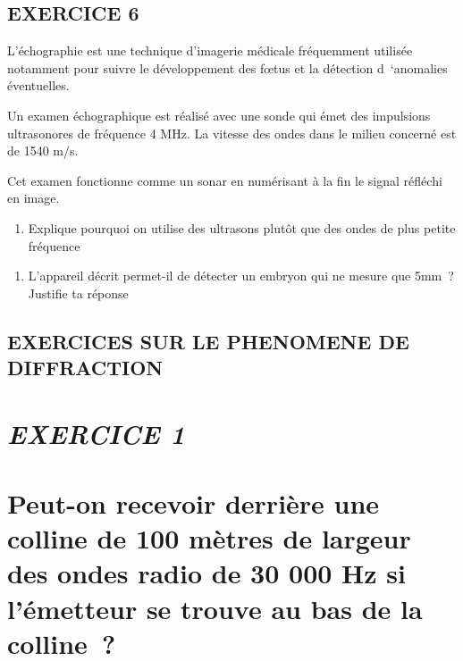 {{{{{{{\subsection{EXERCICE 6}

L'échographie est une technique d'imagerie médicale fréquemment utilisée
notamment pour suivre le développement des fœtus et la détection
d~`anomalies éventuelles.

Un examen échographique est réalisé avec une sonde qui émet des
impulsions ultrasonores de fréquence 4 MHz. La vitesse des ondes dans le
milieu concerné est de 1540 m/s.

Cet examen fonctionne comme un sonar en numérisant à la fin le signal
réfléchi en image.

\begin{enumerate}
\def\labelenumi{\alph{enumi})}
\tightlist
\item
  Explique pourquoi on utilise des ultrasons plutôt que des ondes de
  plus petite fréquence
\end{enumerate}

\begin{enumerate}
\def\labelenumi{\alph{enumi})}
\tightlist
\item
  L'appareil décrit permet-il de détecter un embryon qui ne mesure que
  5mm~? Justifie ta réponse
\end{enumerate}
\subsection{EXERCICES SUR LE PHENOMENE DE DIFFRACTION}

\hypertarget{exercice-1-1}{%
\section{\texorpdfstring{\emph{EXERCICE
1}}{EXERCICE 1}}\label{exercice-1-1}

\hypertarget{section}{%
\section{}\label{section}

\hypertarget{peut-on-recevoir-derriuxe8re-une-colline-de-100-muxe8tres-de-largeur-des-ondes-radio-de-30-000-hz-si-luxe9metteur-se-trouve-au-bas-de-la-colline-1}{%
\section{\texorpdfstring{Peut-on recevoir derrière une colline de 100
mètres de largeur des ondes radio de 30 000 Hz si l'émetteur se trouve
au bas de la colline~?
}{Peut-on recevoir derrière une colline de 100 mètres de largeur des ondes radio de 30 000 Hz si l'émetteur se trouve au bas de la colline~? }}\label{peut-on-recevoir-derriuxe8re-une-colline-de-100-muxe8tres-de-largeur-des-ondes-radio-de-30-000-hz-si-luxe9metteur-se-trouve-au-bas-de-la-colline-1}

}}}}}}}}}}
